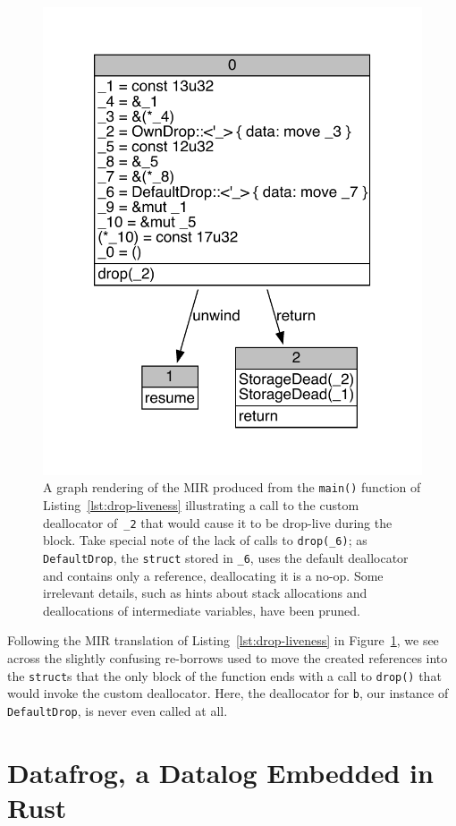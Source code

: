\documentclass[11pt,a4paper,twoside,openany]{report}
\newcommand{\InRust}[1]{\texttt{#1}}
\begin{document}
\begin{figure}
  \includegraphics[width=0.65\linewidth]{Graphs/drop-main-mir}
  \caption[MIR of a Program Utilising a Custom Deallocator]{A graph rendering of
    the MIR produced from the \InRust{main()} function of
    Listing~\ref{lst:drop-liveness} illustrating a call to the custom
    deallocator of~\InRust{_2} that would cause it to be drop-live during the
    block. Take special note of the lack of calls to \InRust{drop(_6)}; as
    \InRust{DefaultDrop}, the \InRust{struct} stored in \InRust{_6}, uses the
    default deallocator and contains only a reference, deallocating it is a
    no-op. Some irrelevant details, such as hints about stack allocations and
    deallocations of intermediate variables, have been pruned.}
  \label{fig:mir-drop}
\end{figure}

Following the MIR translation of Listing~\ref{lst:drop-liveness} in
Figure~\ref{fig:mir-drop}, we see across the slightly confusing re-borrows used
to move the created references into the \InRust{struct}s that the only block of
the function ends with a call to \InRust{drop()} that would invoke the custom
deallocator. Here, the deallocator for \InRust{b}, our instance of
\InRust{DefaultDrop}, is never even called at all.

\section{Datafrog, a Datalog Embedded in Rust}
\label{sec:datalog}
\end{document}
